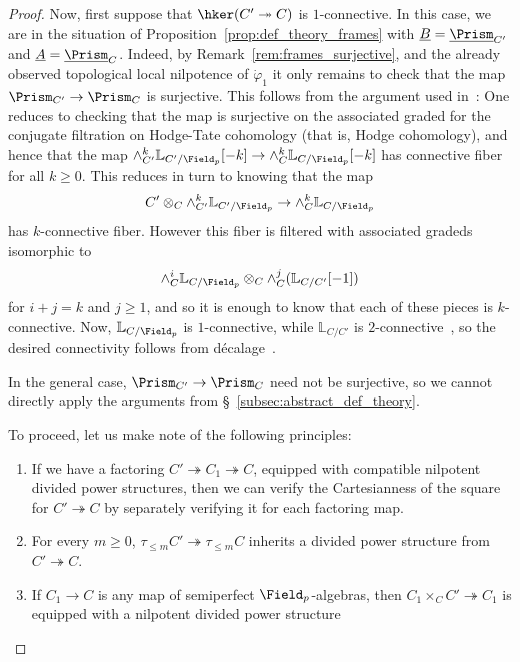\documentclass[10pt]{amsart}
\begin{document}
\begin{proof}
Now, first suppose that $\hker(C'\twoheadrightarrow C)$ is $1$-connective. In this case, we are in the situation of Proposition~\ref{prop:def_theory_frames} with $\underline{B} = \underline{\Prism}_{C'}$ and $\underline{A} = \underline{\Prism}_C$. Indeed, by Remark~\ref{rem:frames_surjective}, and the already observed topological local nilpotence of $\dot{\varphi}_1$ it only remains to check that the map $\Prism_{C'}\to \Prism_C$ is surjective. This follows from the argument used in~\cite[Remark 4.1.20]{bhatt2022absolute}: One reduces to checking that the map is surjective on the associated graded for the conjugate filtration on Hodge-Tate cohomology (that is, Hodge cohomology), and hence that the map $\wedge^k_{C'}\mathbb{L}_{C'/\Field_p}[-k]\to \wedge^k_{C}\mathbb{L}_{C/\Field_p}[-k]$ has connective fiber for all $k\ge 0$. This reduces in turn to knowing that the map
\[
  C'\otimes_C\wedge^k_{C'}\mathbb{L}_{C'/\Field_p}\to \wedge^k_{C}\mathbb{L}_{C/\Field_p}
\]
has $k$-connective fiber. However this fiber is filtered with associated gradeds isomorphic to
\[
   \wedge^i_{C}\mathbb{L}_{C/\Field_p}\otimes_C\wedge^j_C(\mathbb{L}_{C/C'}[-1])
\]
for $i+j=k$ and $j\ge 1$, and so it is enough to know that each of these pieces is $k$-connective. Now, $\mathbb{L}_{C/\Field_p}$ is $1$-connective, while $\mathbb{L}_{C/C'}$ is $2$-connective~\cite[Corollary 25.3.6.4]{Lurie2018-kh}, so the desired connectivity follows from d\'ecalage~\cite[Proposition 25.2.4.2]{Lurie2018-kh}.

In the general case, $\Prism_{C'}\to \Prism_C$ need not be surjective, so we cannot directly apply the arguments from \S~\ref{subsec:abstract_def_theory}. 

To proceed, let us make note of the following principles:
\begin{enumerate}
   \item If we have a factoring $C'\twoheadrightarrow C_1\twoheadrightarrow C$, equipped with compatible nilpotent divided power structures, then we can verify the Cartesianness of the square for $C'\twoheadrightarrow C$ by separately verifying it for each factoring map.
   \item  For every $m\ge 0$, $\tau_{\leq m}C'\twoheadrightarrow \tau_{\leq m}C$ inherits a divided power structure from $C'\twoheadrightarrow C$.
   \item If $C_1\to C$ is any map of semiperfect $\Field_p$-algebras, then $C_1\times_CC'\twoheadrightarrow C_1$ is equipped with a nilpotent divided power structure
\end{enumerate}


\end{proof}
\end{document}
